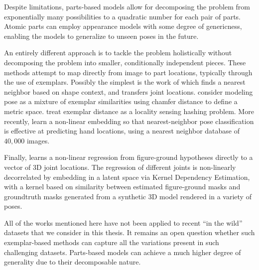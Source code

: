 Despite limitations, parts-based models allow for decomposing the problem from 
exponentially many possibilities to a quadratic number for each pair of parts.  
Atomic parts can employ appearance models with some degree of genericness, 
enabling the models to generalize to unseen poses in the future.

An entirely different approach is to tackle the problem holistically without 
decomposing the problem into smaller, conditionally independent pieces.  These 
methods attempt to map directly from image to part locations, typically through 
the use of exemplars. Possibly the simplest is the work of \citet{mori02} which 
finds a nearest neighbor based on shape context, and transfers joint locations.  
\citet{toyama2002} consider modeling pose as a mixture of exemplar similarities 
using chamfer distance to define a metric space.  \citet{shak2003} treat 
exemplar distance as a locality sensing hashing problem.  More recently, 
\citet{taylorpose} learn a non-linear embedding so that nearest-neighbor pose 
classification is effective at predicting hand locations, using a nearest 
neighbor database of $40,000$ images.

Finally, \citet{ionescu2011} learns a non-linear regression from figure-ground 
hypotheses directly to a vector of 3D joint locations.  The regression of 
different joints is non-linearly decorrelated by embedding in a latent space 
via Kernel Dependency Estimation, with a kernel based on similarity between 
estimated figure-ground masks and groundtruth masks generated from a synthetic 
3D model rendered in a variety of poses. 

All of the works mentioned here have not been applied to recent ``in the wild'' 
datasets that we consider in this thesis.  It remains an open question whether 
such exemplar-based methods can capture all the variations present in such 
challenging datasets.  Parts-based models can achieve a much higher degree of 
generality due to their decomposable nature.


